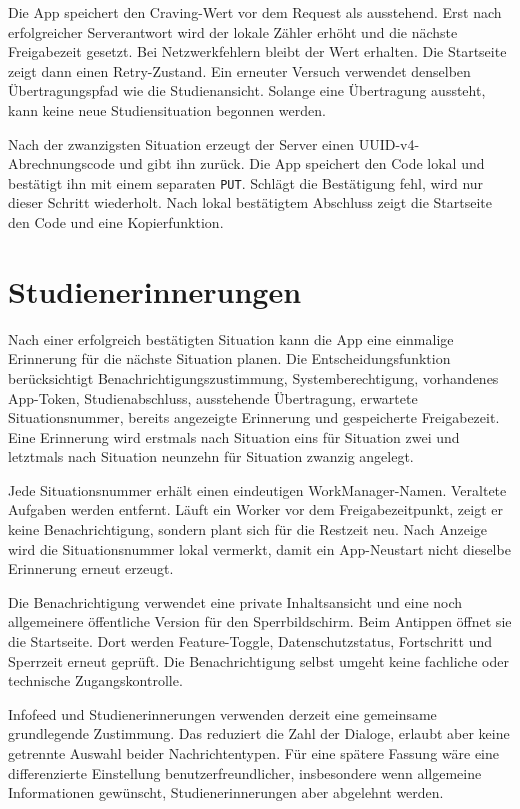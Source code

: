 Die App speichert den Craving-Wert vor dem Request als ausstehend. Erst nach erfolgreicher Serverantwort wird der lokale Zähler erhöht und die nächste Freigabezeit gesetzt. Bei Netzwerkfehlern bleibt der Wert erhalten. Die Startseite zeigt dann einen Retry-Zustand. Ein erneuter Versuch verwendet denselben Übertragungspfad wie die Studienansicht. Solange eine Übertragung aussteht, kann keine neue Studiensituation begonnen werden.

Nach der zwanzigsten Situation erzeugt der Server einen UUID-v4-Abrechnungscode und gibt ihn zurück. Die App speichert den Code lokal und bestätigt ihn mit einem separaten \texttt{PUT}. Schlägt die Bestätigung fehl, wird nur dieser Schritt wiederholt. Nach lokal bestätigtem Abschluss zeigt die Startseite den Code und eine Kopierfunktion.

\section{Studienerinnerungen}
Nach einer erfolgreich bestätigten Situation kann die App eine einmalige Erinnerung für die nächste Situation planen. Die Entscheidungsfunktion berücksichtigt Benachrichtigungszustimmung, Systemberechtigung, vorhandenes App-Token, Studienabschluss, ausstehende Übertragung, erwartete Situationsnummer, bereits angezeigte Erinnerung und gespeicherte Freigabezeit. Eine Erinnerung wird erstmals nach Situation eins für Situation zwei und letztmals nach Situation neunzehn für Situation zwanzig angelegt.

Jede Situationsnummer erhält einen eindeutigen WorkManager-Namen. Veraltete Aufgaben werden entfernt. Läuft ein Worker vor dem Freigabezeitpunkt, zeigt er keine Benachrichtigung, sondern plant sich für die Restzeit neu. Nach Anzeige wird die Situationsnummer lokal vermerkt, damit ein App-Neustart nicht dieselbe Erinnerung erneut erzeugt.

Die Benachrichtigung verwendet eine private Inhaltsansicht und eine noch allgemeinere öffentliche Version für den Sperrbildschirm. Beim Antippen öffnet sie die Startseite. Dort werden Feature-Toggle, Datenschutzstatus, Fortschritt und Sperrzeit erneut geprüft. Die Benachrichtigung selbst umgeht keine fachliche oder technische Zugangskontrolle.

Infofeed und Studienerinnerungen verwenden derzeit eine gemeinsame grundlegende Zustimmung. Das reduziert die Zahl der Dialoge, erlaubt aber keine getrennte Auswahl beider Nachrichtentypen. Für eine spätere Fassung wäre eine differenzierte Einstellung benutzerfreundlicher, insbesondere wenn allgemeine Informationen gewünscht, Studienerinnerungen aber abgelehnt werden.

